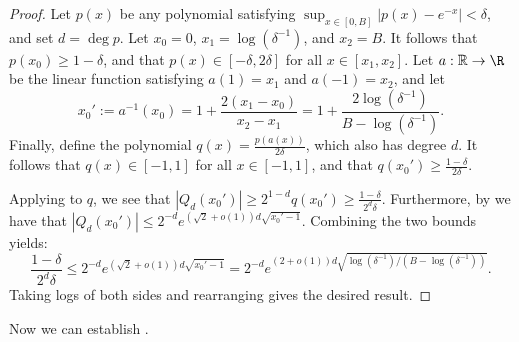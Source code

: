 	\begin{proof}
	Let $p(x)$ be any polynomial satisfying $\sup_{x \in [0, B]} \big| p(x) - e^{-x} \big| < \delta$, and set $d = \deg p$. Let $x_0 = 0$, $x_1 = \log(\delta^{-1})$, and $x_2 = B$. It follows that $p(x_0) \geq 1-\delta$, and that $p(x) \in [-\delta,2\delta]$ for all $x \in [x_1,x_2]$. Let $a : \mathbb{R} \to \R$ be the linear function satisfying $a(1) = x_1$ and $a(-1) = x_2$, and let $$x_0' := a^{-1}(x_0) = 1 + \frac{2(x_1 - x_0)}{x_2 - x_1} = 1 + \frac{2\log(\delta^{-1})}{B-\log(\delta^{-1})}.$$ Finally, define the polynomial $q(x) = \frac{p(a(x))}{2\delta}$, which also has degree $d$.
    It follows that $q(x) \in [-1,1]$ for all $x \in [-1,1]$, and that $q(x_0') \geq \frac{1-\delta}{2\delta}$.
    
    Applying  to $q$, we see that $|Q_d(x_0')| \geq 2^{1-d} q(x_0') \geq \frac{1- \delta}{2^d\delta}$. Furthermore, by  we have that $|Q_d(x_0')| \leq 2^{-d}e^{(\sqrt{2} + o(1)) d \sqrt{x_0' - 1}}$. Combining the two bounds yields:
    $$\frac{1-\delta}{2^d\delta} \leq 2^{-d} e^{(\sqrt{2} + o(1)) d \sqrt{x_0' - 1}} = 2^{-d}e^{(2 + o(1)) d \sqrt{\log(\delta^{-1}) / (B-\log(\delta^{-1}))}}.$$
    Taking logs of both sides and rearranging gives the desired result.
	\end{proof}



    Now we can establish . 


	
	
